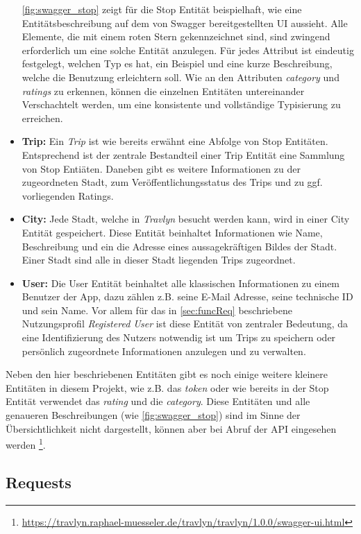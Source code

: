 \begin{itemize}
		\autoref{fig:swagger_stop} zeigt für die Stop Entität beispielhaft, wie eine Entitätsbeschreibung auf dem von Swagger bereitgestellten UI aussieht. Alle Elemente, die mit einem roten Stern gekennzeichnet sind, sind zwingend erforderlich um eine solche Entität anzulegen. Für jedes Attribut ist eindeutig festgelegt, welchen Typ es hat, ein Beispiel und eine kurze Beschreibung, welche die Benutzung erleichtern soll. Wie an den Attributen \textit{category} und \textit{ratings} zu erkennen, können die einzelnen Entitäten untereinander Verschachtelt werden, um eine konsistente und vollständige Typisierung zu erreichen.   
		\item \textbf{Trip:} Ein \textit{Trip} ist wie bereits erwähnt eine Abfolge von Stop Entitäten. Entsprechend ist der zentrale Bestandteil einer Trip Entität eine Sammlung von Stop Entiäten. Daneben gibt es weitere Informationen zu der zugeordneten Stadt, zum Veröffentlichungsstatus des Trips und zu ggf. vorliegenden Ratings.
		\item \textbf{City:} Jede Stadt, welche in \textit{Travlyn} besucht werden kann, wird in einer City Entität gespeichert. Diese Entität beinhaltet Informationen wie Name, Beschreibung und ein die Adresse eines aussagekräftigen Bildes der Stadt. Einer Stadt sind alle in dieser Stadt liegenden Trips zugeordnet. 
		\item \textbf{User:} Die User Entität beinhaltet alle klassischen Informationen zu einem Benutzer der App, dazu zählen z.B. seine E-Mail Adresse, seine technische ID und sein Name. Vor allem für das in  \autoref{sec:funcReq} beschriebene Nutzungsprofil \textit{Registered User} ist diese Entität von zentraler Bedeutung, da eine Identifizierung des Nutzers notwendig ist um Trips zu speichern oder persönlich zugeordnete Informationen anzulegen und zu verwalten.
	\end{itemize}

	Neben den hier beschriebenen Entitäten gibt es noch einige weitere kleinere Entitäten in diesem Projekt, wie z.B. das \textit{token} oder wie bereits in der Stop Entität verwendet das \textit{rating} und die \textit{category}. Diese Entitäten und alle genaueren Beschreibungen (wie \autoref{fig:swagger_stop}) sind im Sinne der Übersichtlichkeit nicht dargestellt, können aber bei Abruf der API eingesehen werden \footnote{\url{https://travlyn.raphael-muesseler.de/travlyn/travlyn/1.0.0/swagger-ui.html}}.
	
	\subsection{Requests}
	\label{sec:konzept.kommunikation.requests}
	
